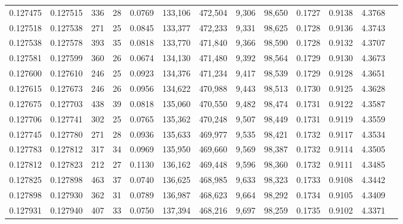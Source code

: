 \begin{tabular}{rrrrrrrrrrrrr}
0.127475 & 0.127515 &   336 &  28 &                                     0.0769 & 133,106 & 472,504 &   9,306 &  98,650 & 0.1727 & 0.9138 & 4.3768 \\
0.127518 & 0.127538 &   271 &  25 &                                     0.0845 & 133,377 & 472,233 &   9,331 &  98,625 & 0.1728 & 0.9136 & 4.3743 \\
0.127538 & 0.127578 &   393 &  35 &                                     0.0818 & 133,770 & 471,840 &   9,366 &  98,590 & 0.1728 & 0.9132 & 4.3707 \\
0.127581 & 0.127599 &   360 &  26 &                                     0.0674 & 134,130 & 471,480 &   9,392 &  98,564 & 0.1729 & 0.9130 & 4.3673 \\
0.127600 & 0.127610 &   246 &  25 &                                     0.0923 & 134,376 & 471,234 &   9,417 &  98,539 & 0.1729 & 0.9128 & 4.3651 \\
0.127615 & 0.127673 &   246 &  26 &                                     0.0956 & 134,622 & 470,988 &   9,443 &  98,513 & 0.1730 & 0.9125 & 4.3628 \\
0.127675 & 0.127703 &   438 &  39 &                                     0.0818 & 135,060 & 470,550 &   9,482 &  98,474 & 0.1731 & 0.9122 & 4.3587 \\
0.127706 & 0.127741 &   302 &  25 &                                     0.0765 & 135,362 & 470,248 &   9,507 &  98,449 & 0.1731 & 0.9119 & 4.3559 \\
0.127745 & 0.127780 &   271 &  28 &                                     0.0936 & 135,633 & 469,977 &   9,535 &  98,421 & 0.1732 & 0.9117 & 4.3534 \\
0.127783 & 0.127812 &   317 &  34 &                                     0.0969 & 135,950 & 469,660 &   9,569 &  98,387 & 0.1732 & 0.9114 & 4.3505 \\
0.127812 & 0.127823 &   212 &  27 &                                     0.1130 & 136,162 & 469,448 &   9,596 &  98,360 & 0.1732 & 0.9111 & 4.3485 \\
0.127825 & 0.127898 &   463 &  37 &                                     0.0740 & 136,625 & 468,985 &   9,633 &  98,323 & 0.1733 & 0.9108 & 4.3442 \\
0.127898 & 0.127930 &   362 &  31 &                                     0.0789 & 136,987 & 468,623 &   9,664 &  98,292 & 0.1734 & 0.9105 & 4.3409 \\
0.127931 & 0.127940 &   407 &  33 &                                     0.0750 & 137,394 & 468,216 &   9,697 &  98,259 & 0.1735 & 0.9102 & 4.3371 \\

\end{tabular}
